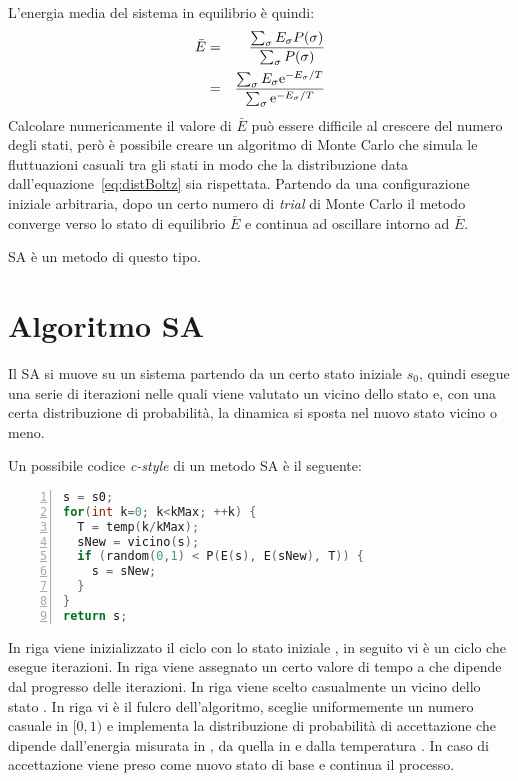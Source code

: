 L'energia media del sistema in equilibrio \`e quindi:
\begin{eqnarray*}
  \bar{E} &=& \frac{\sum_\sigma E_\sigma P(\sigma)}{\sum_\sigma
    P(\sigma)}\\
  &=& \frac{\sum_\sigma E_\sigma \mathrm{e}^{-E_\sigma/T}}{\sum_\sigma \mathrm{e}^{-E_\sigma/T}}
\end{eqnarray*}
Calcolare numericamente il valore di $\bar{E}$ pu\`o essere
difficile al crescere del numero degli stati, per\`o \`e possibile
creare un algoritmo di Monte Carlo che simula le fluttuazioni casuali
tra gli stati in modo che la distribuzione data
dall'equazione~\eqref{eq:distBoltz} sia rispettata. Partendo da una
configurazione iniziale arbitraria, dopo un certo numero di \emph{trial} di Monte
Carlo il metodo converge verso lo stato di
equilibrio $\bar{E}$ e continua ad oscillare intorno ad $\bar{E}$.

\ac{SA} \`e un metodo di questo tipo.

\section{Algoritmo \acf{SA}}
Il \ac{SA} si muove su un sistema partendo da un certo stato iniziale
$s_0$, quindi esegue una serie di iterazioni nelle quali viene
valutato un vicino dello stato e, con una certa distribuzione di
probabilit\`a, la dinamica si sposta nel nuovo stato vicino o meno.

Un possibile codice \emph{c-style} di un metodo \ac{SA} \`e il seguente:
\begin{lstlisting}[frame=single, numbers=left, language=C]
s = s0;
for(int k=0; k<kMax; ++k) {
  T = temp(k/kMax);
  sNew = vicino(s);
  if (random(0,1) < P(E(s), E(sNew), T)) {
    s = sNew;
  }
}
return s;
\end{lstlisting}
In riga  viene inizializzato il ciclo con lo stato iniziale
, in seguito vi \`e un ciclo che esegue 
iterazioni. In riga  viene assegnato un certo
valore di tempo a  che dipende dal progresso delle
iterazioni. In riga  viene scelto casualmente un vicino  dello
stato . In riga  vi \`e il fulcro dell'algoritmo,
 sceglie uniformemente un numero casuale in $[0,1)$ e
 implementa la distribuzione di probabilit\`a di accettazione
che dipende dall'energia
misurata in , da quella in  e dalla temperatura
. In caso di accettazione viene preso  come nuovo
stato di base e continua il processo.

